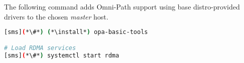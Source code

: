 The following command adds Omni-Path support using base distro-provided drivers
to the chosen {\em master} host.

\begin{lstlisting}[language=bash,keywords={}]
[sms](*\#*) (*\install*) opa-basic-tools

# Load RDMA services
[sms](*\#*) systemctl start rdma
\end{lstlisting}




